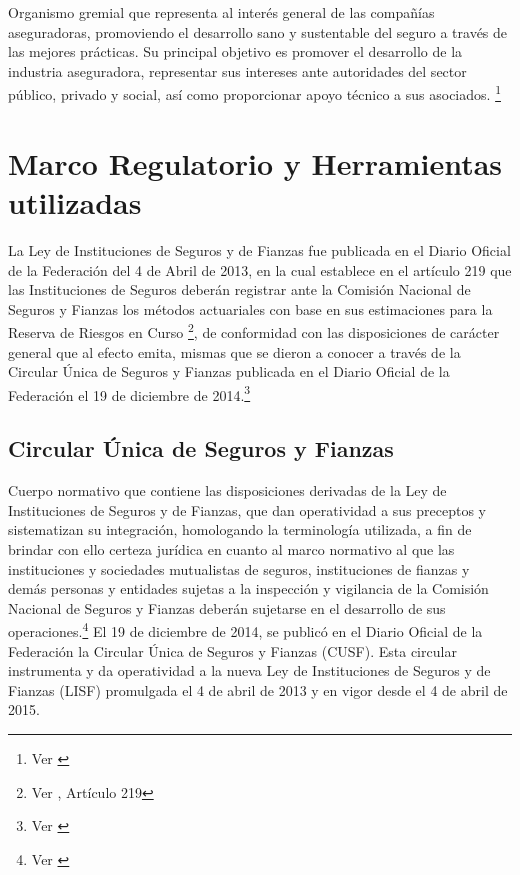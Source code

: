 \documentclass[11pt,twoside,openright,spanish]{report}
\numberwithin{equation}{chapter}
\numberwithin{figure}{chapter}
\numberwithin{table}{chapter}
\begin{document}
	Organismo gremial que representa al interés general de las compañías aseguradoras, promoviendo el desarrollo sano y sustentable del seguro a través de las mejores prácticas. Su principal objetivo es promover el desarrollo de la industria aseguradora, representar sus  intereses ante autoridades del sector público, privado y social, así como proporcionar apoyo técnico a sus asociados. \footnote{Ver \citet{FAmis}}
	
	
	\chapter{Marco Regulatorio y Herramientas utilizadas}\label{tcyedb}
	
	\doublespacing
	La Ley de Instituciones de Seguros y de Fianzas fue publicada en el Diario Oficial de la Federación del 4 de Abril de 2013, en la cual establece en el artículo 219 que las Instituciones de Seguros deberán registrar ante la Comisión Nacional de Seguros y Fianzas los métodos actuariales con base en sus estimaciones para la Reserva de Riesgos en Curso \footnote{Ver \citet{FAmis}, Artículo 219}, de conformidad con las disposiciones de carácter general que al efecto emita, mismas que se dieron a conocer a través de la Circular Única de Seguros y Fianzas publicada en el Diario Oficial de la Federación el 19 de diciembre de 2014.\footnote{Ver \citet{HCusf}}
	
	\section{Circular Única de Seguros y Fianzas}
	\doublespacing
	
	Cuerpo normativo que contiene las disposiciones derivadas de la Ley de Instituciones de Seguros y de Fianzas, que dan operatividad a sus preceptos y sistematizan su integración, homologando la terminología utilizada, a fin de brindar con ello certeza jurídica en cuanto al marco normativo al que las instituciones y sociedades mutualistas de seguros, instituciones de fianzas y demás personas y entidades sujetas a la inspección y vigilancia de la Comisión Nacional de Seguros y Fianzas deberán sujetarse en el desarrollo de sus operaciones.\footnote{Ver \citet{IDefCusf}} El 19 de diciembre de 2014, se publicó en el Diario Oficial de la Federación la Circular Única de Seguros y Fianzas (CUSF). Esta circular instrumenta y da operatividad a la nueva Ley de Instituciones de Seguros y de Fianzas (LISF) promulgada el 4 de abril de 2013 y en vigor desde el 4 de abril de 2015. 
	
\end{document}
